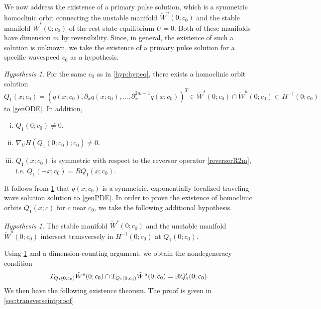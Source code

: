 \documentclass[12pt]{elsarticle}
\theoremstyle{plain}
\theoremstyle{definition}
\theoremstyle{remark}
\newtheorem{hypothesis}[theorem]{Hypothesis}
\numberwithin{theorem}{section}
\numberwithin{equation}{section}
\begin{document}
We now address the existence of a primary pulse solution, which is a symmetric homoclinic orbit connecting the unstable manifold $\tilde{W}^u(0; c_0)$ and the stable manifold $\tilde{W}^s(0; c_0)$ of the rest state equilibrium $U = 0$. Both of these manifolds have dimension $m$ by reversibility. Since, in general, the existence of such a solution is unknown, we take the existence of a primary pulse solution for a specific wavespeed $c_0$ as a hypothesis.

\begin{hypothesis}\label{Qexistshyp}
For the same $c_0$ as in \cref{hyp:hypeq}, there exists a homoclinic orbit solution $Q_1(x; c_0) = (q(x; c_0), \partial_x q(x; c_0), \dots, \partial_x^{2m-1}q(x; c_0))^T\in \tilde{W}^s(0; c_0) \cap \tilde{W}^u(0; c_0) \subset H^{-1}(0; c_0)$ to \cref{genODE}. In addition,
\begin{enumerate}[(i)]
\item $Q_1(0; c_0) \neq 0$.
\item $\nabla_U H(Q_1(0; c_0); c_0) \neq 0$.
\item $Q_1(x; c_0)$ is symmetric with respect to the reversor operator \cref{reverserR2m}, i.e. $Q_1(-x; c_0) = R Q_1(x; c_0)$.
\end{enumerate}
\end{hypothesis}

\noi It follows from \cref{Qexistshyp} that $q(x; c_0)$ is a symmetric, exponentially localized traveling wave solution solution to \cref{genPDE}. In order to prove the  existence of homoclinic orbits $Q_1(x; c)$ for $c$ near $c_0$, we take the following additional hypothesis.

\begin{hypothesis}\label{hyp:transverse}
The stable manifold $\tilde{W}^s(0; c_0)$ and the unstable manifold $\tilde{W}^u(0; c_0)$ intersect transversely in $H^{-1}(0; c_0)$ at $Q_1(0; c_0)$.
\end{hypothesis}

\noi Using \cref{hyp:transverse} and a dimension-counting argument, we obtain the nondegeneracy condition
\begin{equation}\label{nondegencond}
T_{Q_1(0; c_0)}\tilde{W}^s(0; c_0) \cap T_{Q_1(0; c_0)}\tilde{W}^u(0; c_0) = \mathbb{R} Q_1'(0; c_0).
\end{equation}
We then have the following existence theorem. The proof is given in \cref{sec:transverseintproof}.
\end{document}
